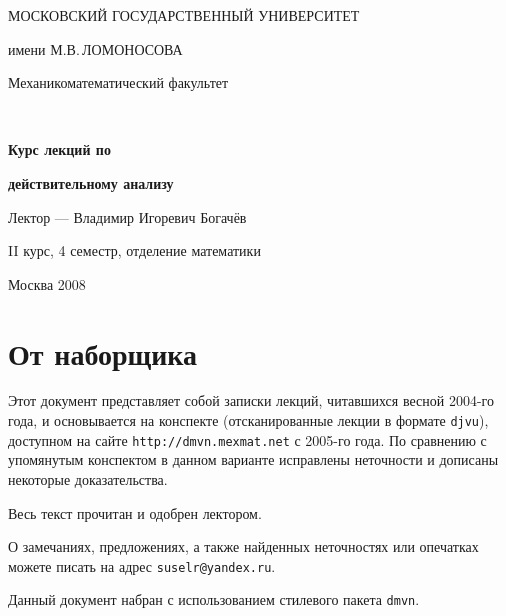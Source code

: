 \documentclass[10pt]{article}
\begin{document}
\renewcommand{\contentsname}{Оглавление}

\begin{titlepage}

\begin{center}

\vskip40pt

{\Large МОСКОВСКИЙ ГОСУДАРСТВЕННЫЙ УНИВЕРСИТЕТ

\medskip

имени М.В.\,ЛОМОНОСОВА

\bigskip

Механико\д математический факультет}

\par\vskip30pt

\\ %

\vskip30pt

{\huge\textbf{\textsf{Курс лекций по}}}

\medskip

{\huge\textbf{\textsf{действительному анализу}}}

\bigskip

{\large\textsf{Лектор --- Владимир Игоревич Богачёв}}

\vskip50pt

{\Large II курс, 4 семестр, отделение математики}

\vfill

{\large Москва 2008}

\end{center}

\end{titlepage}


\section*{От наборщика}

Этот документ представляет собой записки лекций, читавшихся весной
2004-го года, и основывается на конспекте (отсканированные лекции в
формате \texttt{djvu}), доступном на сайте
\texttt{http://dmvn.mexmat.net} с 2005-го года. По сравнению с
упомянутым конспектом в данном варианте исправлены неточности и
дописаны некоторые доказательства.

Весь текст прочитан и одобрен лектором.

О замечаниях, предложениях, а также найденных неточностях или
опечатках можете писать на адрес \texttt{suselr@yandex.ru}.

Данный документ набран с использованием стилевого пакета
\texttt{dmvn}.
\end{document}

